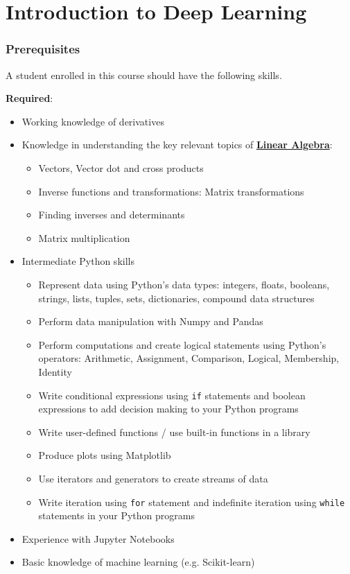 \part{Introduction to Deep Learning}


\section{Prerequisites}

A student enrolled in this course should have the following skills.

\textbf{Required}:

\begin{itemize}
    \item Working knowledge of derivatives
    \item Knowledge in understanding the key relevant topics of \href{https://www.udacity.com/course/linear-algebra-refresher-course--ud953}{\textbf{Linear Algebra}}:

\begin{itemize}
        \item Vectors, Vector dot and cross products
        \item Inverse functions and transformations: Matrix transformations
        \item Finding inverses and determinants
        \item Matrix multiplication
\end{itemize}

    \item Intermediate Python skills

\begin{itemize}
        \item Represent data using Python's data types: integers, floats, booleans, strings, lists, tuples, sets, dictionaries, compound data structures
        \item Perform data manipulation with Numpy and Pandas
        \item Perform computations and create logical statements using Python’s operators: Arithmetic, Assignment, Comparison, Logical, Membership, Identity
        \item Write conditional expressions using \verb|if| statements and boolean expressions to add decision making to your Python programs
        \item Write user-defined functions / use built-in functions in a library
        \item Produce plots using Matplotlib
        \item Use iterators and generators to create streams of data
        \item Write iteration using \verb|for| statement and indefinite iteration using \verb|while| statements in your Python programs
\end{itemize}

    \item Experience with Jupyter Notebooks
    \item Basic knowledge of machine learning (e.g. Scikit-learn)
\end{itemize}

